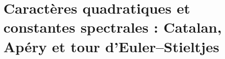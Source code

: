 \chapter{Caractères quadratiques et constantes spectrales : Catalan, Apéry et tour d’Euler--Stieltjes}
\label{chap:p3-final:41:catalan_apery_euler}


